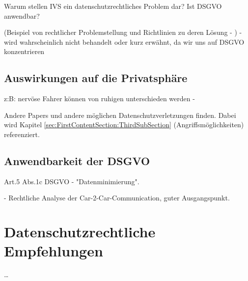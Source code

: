 Warum stellen IVS ein datenschutzrechtliches Problem dar? Ist DSGVO anwendbar? 

(Beispiel von rechtlicher Problemstellung und Richtlinien zu deren Lösung - \cite{EUCooperativeV2X} ) - wird wahrscheinlich nicht behandelt oder kurz erwähnt, da wir uns auf DSGVO konzentrieren


\subsection{Auswirkungen auf die Privatsphäre}
\label{sec:SecondContentSection:FirstSubsection}

z:B: nervöse Fahrer können von ruhigen unterschieden werden - \cite{Dettki2005}

Andere Papers und andere möglichen Datenschutzverletzungen finden. Dabei wird Kapitel  \ref{sec:FirstContentSection:ThirdSubSection} (Angriffsmöglichkeiten) referenziert.

\subsection{Anwendbarkeit der DSGVO}
\label{sec:SecondContentSection:SecondSubsection}

Art.5 Abs.1c DSGVO - "Datenminimierung". 

\cite{Weichert2016} - Rechtliche Analyse der Car-2-Car-Communication, guter Ausgangspunkt.

\section{Datenschutzrechtliche Empfehlungen}
\label{ch:ThirdContentSection}

\dots

